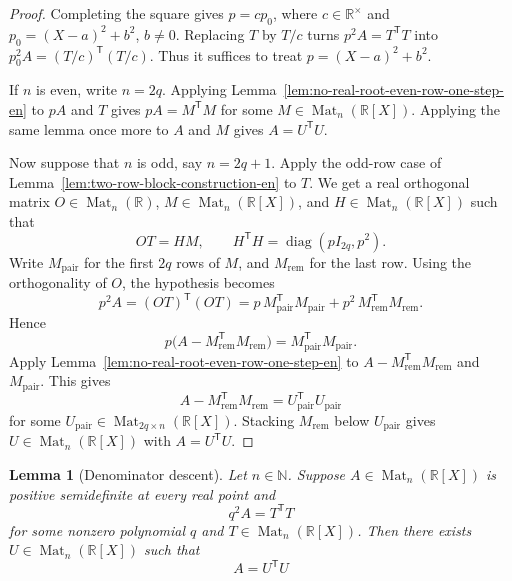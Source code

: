 \documentclass[uplatex,dvipdfmx]{jsarticle}
\newcommand{\Poly}{\mathbb{R}[X]}
\newcommand{\Mat}{\operatorname{Mat}}
\theoremstyle{matrixsosdefinition}
\newtheorem{lemma}[theorem]{Lemma}
\begin{document}
\begin{proof}
  Completing the square gives \(p=c p_0\), where \(c\in\mathbb R^\times\)
  and \(p_0=(X-a)^2+b^2\), \(b\ne0\).  Replacing \(T\) by \(T/c\) turns
  \(p^2A=T^{\mathsf T}T\) into \(p_0^2A=(T/c)^{\mathsf T}(T/c)\).
  Thus it suffices to treat \(p=(X-a)^2+b^2\).

  If \(n\) is even, write \(n=2q\).  Applying
  Lemma~\ref{lem:no-real-root-even-row-one-step-en} to \(pA\) and \(T\) gives
  \(pA=M^{\mathsf T}M\) for some \(M\in\Mat_n(\Poly)\).  Applying the same
  lemma once more to \(A\) and \(M\) gives \(A=U^{\mathsf T}U\).

  Now suppose that \(n\) is odd, say \(n=2q+1\).
  Apply the odd-row case of Lemma~\ref{lem:two-row-block-construction-en} to \(T\).
  We get a real orthogonal matrix \(O\in\Mat_n(\mathbb{R})\),
  \(M\in\Mat_n(\Poly)\), and \(H\in\Mat_n(\Poly)\) such that
  \[
    OT=HM,\qquad H^{\mathsf T}H=\operatorname{diag}(pI_{2q},p^2).
  \]
  Write \(M_{\mathrm{pair}}\)
  for the first \(2q\) rows of \(M\), and \(M_{\mathrm{rem}}\) for the last row.
  Using the orthogonality of \(O\), the hypothesis becomes
  \[
    p^2A
      =(OT)^{\mathsf T}(OT)
      =
    p\,M_{\mathrm{pair}}^{\mathsf T}M_{\mathrm{pair}}
    +p^2\,M_{\mathrm{rem}}^{\mathsf T}M_{\mathrm{rem}}.
  \]
  Hence
  \[
    p\bigl(A-M_{\mathrm{rem}}^{\mathsf T}M_{\mathrm{rem}}\bigr)
      =
    M_{\mathrm{pair}}^{\mathsf T}M_{\mathrm{pair}}.
  \]
  Apply Lemma~\ref{lem:no-real-root-even-row-one-step-en} to
  \(A-M_{\mathrm{rem}}^{\mathsf T}M_{\mathrm{rem}}\) and \(M_{\mathrm{pair}}\).
  This gives
  \[
    A-M_{\mathrm{rem}}^{\mathsf T}M_{\mathrm{rem}}
      =
    U_{\mathrm{pair}}^{\mathsf T}U_{\mathrm{pair}}
  \]
  for some \(U_{\mathrm{pair}}\in\Mat_{2q\times n}(\Poly)\).  Stacking
  \(M_{\mathrm{rem}}\) below \(U_{\mathrm{pair}}\) gives
  \(U\in\Mat_n(\Poly)\) with \(A=U^{\mathsf T}U\).
\end{proof}

\begin{lemma}[Denominator descent]\label{lem:denominator-descent-en}
  Let \(n\in\mathbb{N}\).
  Suppose \(A\in\Mat_n(\Poly)\) is positive semidefinite at every real point
  and
  \[
    q^2A=T^{\mathsf T}T
  \]
  for some nonzero polynomial \(q\) and
  \(T\in\Mat_n(\Poly)\). Then there exists
  \(U\in\Mat_n(\Poly)\) such that
  \[
    A=U^{\mathsf T}U
  \]
\end{lemma}
\end{document}

